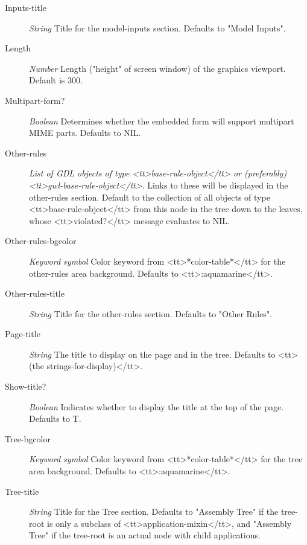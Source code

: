 \documentclass [11pt]{book}
\begin{document}
\begin{itemize}
\begin{description}
\item [Inputs-title]
\emph{String} Title for the model-inputs section. Defaults to "Model Inputs".


\item [Length]
\emph{Number} Length ("height" of screen window) of the graphics viewport. Default is 300.


\item [Multipart-form?]
\emph{Boolean} Determines whether the embedded form will support multipart MIME parts. Defaults to NIL.


\item [Other-rules]
\emph{List of GDL objects of type <tt>base-rule-object</tt> or (preferably) <tt>gwl-base-rule-object</tt>}.
Links to these will be displayed in the other-rules section. Default to the collection of all objects of type
<tt>base-rule-object</tt> from this node in the tree down to the leaves, whose <tt>violated?</tt> message
evaluates to NIL.


\item [Other-rules-bgcolor]
\emph{Keyword symbol} Color keyword from <tt>*color-table*</tt> for the other-rules area  background. Defaults to <tt>:aquamarine</tt>.


\item [Other-rules-title]
\emph{String} Title for the other-rules section. Defaults to "Other Rules".


\item [Page-title]
\emph{String} The title to display on the page and in the tree. Defaults to <tt>(the strings-for-display)</tt>.


\item [Show-title?]
\emph{Boolean} Indicates whether to display the title at the top of the page. Defaults to T.


\item [Tree-bgcolor]
\emph{Keyword symbol} Color keyword from <tt>*color-table*</tt> for the tree area background. Defaults to <tt>:aquamarine</tt>.


\item [Tree-title]
\emph{String} Title for the Tree section. Defaults to "Assembly Tree" if the tree-root is only a
subclass of <tt>application-mixin</tt>, and "Assembly Tree" if the tree-root is an actual node with
child applications.



\end{description}
\end{itemize}
\end{document}
